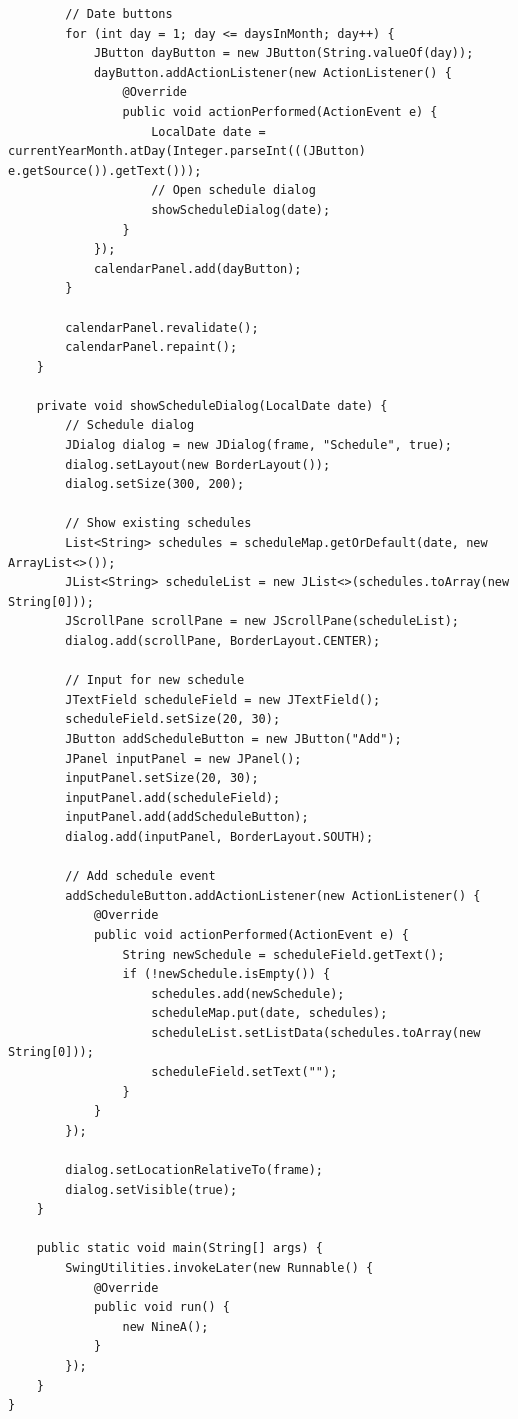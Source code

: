 \documentclass[12pt,a4paper]{article}
\begin{document}
\begin{lstlisting}
        // Date buttons
        for (int day = 1; day <= daysInMonth; day++) {
            JButton dayButton = new JButton(String.valueOf(day));
            dayButton.addActionListener(new ActionListener() {
                @Override
                public void actionPerformed(ActionEvent e) {
                    LocalDate date = currentYearMonth.atDay(Integer.parseInt(((JButton) e.getSource()).getText()));
                    // Open schedule dialog
                    showScheduleDialog(date);
                }
            });
            calendarPanel.add(dayButton);
        }

        calendarPanel.revalidate();
        calendarPanel.repaint();
    }

    private void showScheduleDialog(LocalDate date) {
        // Schedule dialog
        JDialog dialog = new JDialog(frame, "Schedule", true);
        dialog.setLayout(new BorderLayout());
        dialog.setSize(300, 200);

        // Show existing schedules
        List<String> schedules = scheduleMap.getOrDefault(date, new ArrayList<>());
        JList<String> scheduleList = new JList<>(schedules.toArray(new String[0]));
        JScrollPane scrollPane = new JScrollPane(scheduleList);
        dialog.add(scrollPane, BorderLayout.CENTER);

        // Input for new schedule
        JTextField scheduleField = new JTextField();
        scheduleField.setSize(20, 30);
        JButton addScheduleButton = new JButton("Add");
        JPanel inputPanel = new JPanel();
        inputPanel.setSize(20, 30);
        inputPanel.add(scheduleField);
        inputPanel.add(addScheduleButton);
        dialog.add(inputPanel, BorderLayout.SOUTH);

        // Add schedule event
        addScheduleButton.addActionListener(new ActionListener() {
            @Override
            public void actionPerformed(ActionEvent e) {
                String newSchedule = scheduleField.getText();
                if (!newSchedule.isEmpty()) {
                    schedules.add(newSchedule);
                    scheduleMap.put(date, schedules);
                    scheduleList.setListData(schedules.toArray(new String[0]));
                    scheduleField.setText("");
                }
            }
        });

        dialog.setLocationRelativeTo(frame);
        dialog.setVisible(true);
    }

    public static void main(String[] args) {
        SwingUtilities.invokeLater(new Runnable() {
            @Override
            public void run() {
                new NineA();
            }
        });
    }
}

\end{lstlisting}
\end{document}
